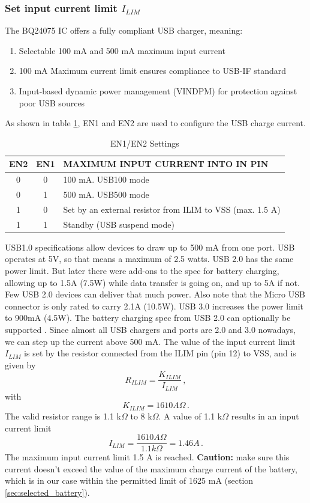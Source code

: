 \documentclass[11pt,a4paper]{article}
\begin{document}
\subsubsection{Set input current limit $I_{LIM}$}
The BQ24075 IC offers a fully compliant USB charger, meaning:
\begin{enumerate}
	\item Selectable 100 mA and 500 mA maximum input current
	\item 100 mA Maximum current limit ensures compliance to USB-IF standard
	\item Input-based dynamic power management (VINDPM) for protection against poor USB sources
\end{enumerate}
As shown in table \ref{table:USBmode}, EN1 and EN2 are used to configure the USB charge current.
\begin{table}[H]
	\caption{EN1/EN2 Settings \cite{bib:BQ24075}}
	\label{table:USBmode}
	\begin{tabular}{c|c|l}
		EN2 & EN1 & MAXIMUM INPUT CURRENT INTO IN PIN            				\\
		\hline
		0   & 0   & 100 mA. USB100 mode                          				\\
		0   & 1   & 500 mA. USB500 mode                          				\\
		1   & 0   & Set by an external resistor from ILIM to VSS (max. 1.5 A) 	\\
		1   & 1   & Standby (USB suspend mode)                  
	\end{tabular}
\end{table}
USB1.0 specifications allow devices to draw up to 500 mA from one port. USB operates at 5V, so that means a maximum of 2.5 watts. USB 2.0 has the same power limit. But later there were add-ons to the spec for battery charging, allowing up to 1.5A (7.5W) while data transfer is going on, and up to 5A if not. Few USB 2.0 devices can deliver that much power. Also note that the Micro USB connector is only rated to carry 2.1A (10.5W). USB 3.0 increases the power limit to 900mA (4.5W). The battery charging spec from USB 2.0 can optionally be supported \cite{USBpowers}. Since almost all USB chargers and ports are 2.0 and 3.0 nowadays, we can step up the current above 500 mA. The value of the input current limit $I_{LIM}$ is set by the resistor connected from the ILIM pin (pin 12) to VSS, and is given by \cite{bib:BQ24075}
\begin{equation}\label{equ:relationK_ILIM}
R_{ILIM} = \frac{K_{ILIM}}{I_{LIM}} \,,
\end{equation}
with 
\begin{equation}\label{equ:K_ILIM}
K_{ILIM} = 1610 A\Omega \,.
\end{equation}
The valid resistor range is 1.1 k$\Omega$ to 8 k$\Omega$. A value of 1.1 k$\Omega$ results in an input current limit 
\begin{equation}\label{equ:I_LIM}
I_{LIM} = \frac{1610 A\Omega}{1.1 k\Omega} = 1.46 A \,.
\end{equation}
The maximum input current limit 1.5 A is reached. \textbf{Caution:} make sure this current doesn't exceed the value of the maximum charge current of the battery, which is in our case within the permitted limit of 1625 mA (section \ref{sec:selected_battery}).
\end{document}
